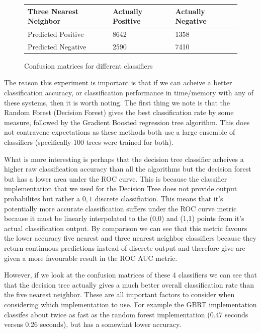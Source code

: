 \documentclass[ %
                    author={Sam Phippen},
                supervisor={Dr. Rafal Bogacz},
                     title={Real time voice activity detectors in noisy personal computing environments},
                  subtitle={},
                    degree={MEng},
                      year={2012} ]{thesis}
\begin{document}
\begin{figure}
    \begin{tabular}{|l||l|l|}
        \hline
        Three Nearest Neighbor & Actually Positive & Actually Negative \\ \hline
        Predicted Positive     & 8642              & 1358               \\ \hline
        Predicted Negative     & 2590              & 7410              \\ \hline
    \end{tabular}

    \vspace{0.75cm}

    \caption{Confusion matrices for different classifiers}

\end{figure}

The reason this experiment is important is that if we can acheive a better
classification accuracy, or classification performance in time/memory with any
of these systems, then it is worth noting. The first thing we note is that the
Random Forest (Decision Forest) gives the best classification rate by some
measure, followed by the Gradient Boosted regression tree algorithm. This does
not contravene expectations as these methods both use a large ensemble of
classifiers (specifically 100 trees were trained for both).

What is more interesting is perhaps that the decision tree classifier acheives
a higher raw classification accuracy than all the algorithms but the decision
forest but has a lower area under the ROC curve. This is because the classifier
implementation that we used for the Decision Tree does not provide output
probabilites but rather a ${0,1}$ discrete classifiation. This means that it's
potentially more accurate classification suffers under the ROC curve metric
because it must be linearly interpolated to the (0,0) and (1,1) points from
it's actual classification output. By comparison we can see that this metric
favours the lower accuracy five nearest and three nearest neighbor classifiers
because they return continuous predictions instead of discrete output and
therefore give are given a more favourable result in the ROC AUC metric.

However, if we look at the confusion matrices of these 4 classifiers we can see
that that the decision tree actually gives a much better overall classification
rate than the five nearest neighbor. These are all important factors to
consider when considering which implementation to use. For example the GBRT
implementation classifes about twice as fast as the random forest
implementation (0.47 seconds versus 0.26 seconds), but has a somewhat lower
accuracy.
\end{document}
